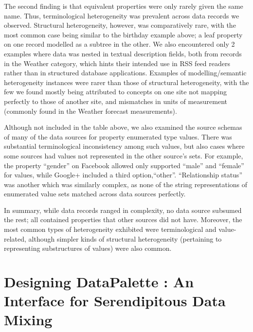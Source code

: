 \documentclass{sigchi}
\begin{document}
The second finding is that equivalent properties were only rarely given the same name.  Thus, terminological heterogeneity was prevalent across data records we observed.  Structural heterogeneity, however, was comparatively rare, with the most common case being similar to the birthday example above; a leaf property on one record modelled as a subtree in the other.  We also encountered only 2 examples where data was nested in textual description fields, both from records in the Weather category, which hints their intended use in RSS feed readers rather than in structured database applications.  Examples of modelling/semantic heterogeneity instances were rarer than those of structural heterogeneity, with the few we found mostly being attributed to concepts on one site not mapping perfectly to those of another site, and mismatches in units of measurement (commonly found in the Weather forecast measurements).

Although not included in the table above, we also examined the source schemas of many of the data sources for property enumerated type values.  There was substantial terminological inconsistency among such values, but also cases where some sources had values not represented in the other source's sets.  For example, the property ``gender''  on Facebook allowed only supported ``male'' and ``female'' for values, while Google+ included a third option,``other''.  ``Relationship status'' was another which was similarly complex, as none of the string representations of enumerated value sets matched across data sources perfectly.

In summary, while data records ranged in complexity, no data source subsumed the rest; all contained properties that other sources did not have.  Moreover, the most common types of heterogeneity exhibited were terminological and value-related, although simpler kinds of structural heterogeneity (pertaining to representing substructures of values) were also common.

\section{Designing DataPalette : An Interface for Serendipitous Data Mixing}
\end{document}
